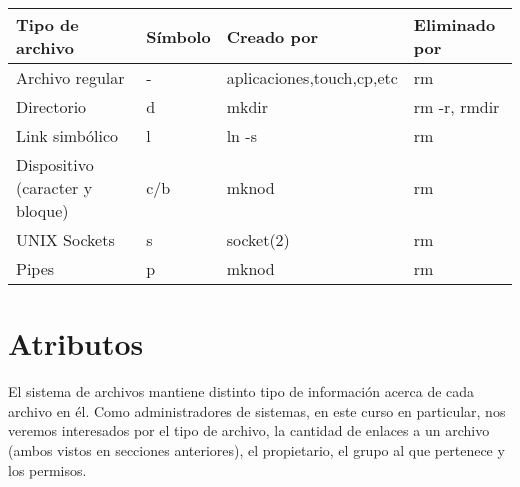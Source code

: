 \documentclass[12pt]{article}
\begin{document}
\begin{center}
\begin{tabular}{llll}\hline
\rowcolor{tcA}
Tipo de archivo & Símbolo & Creado por & Eliminado por\\\hline
Archivo regular & - & aplicaciones,touch,cp,etc & rm\\
Directorio & d & mkdir & rm -r, rmdir\\
Link simbólico & l & ln -s & rm \\
Dispositivo (caracter y bloque) & c/b & mknod & rm\\
UNIX Sockets & s & socket(2) & rm\\
Pipes & p & mknod & rm\\\hline
\end{tabular}
\end{center}


\section*{Atributos}
El sistema de archivos mantiene distinto tipo de información acerca de cada archivo en él. 
Como administradores de sistemas, en este curso en particular, nos veremos interesados
por el tipo de archivo, la cantidad de enlaces a un archivo (ambos vistos en secciones 
anteriores), el propietario, el grupo al que pertenece y los permisos. 
\end{document}

